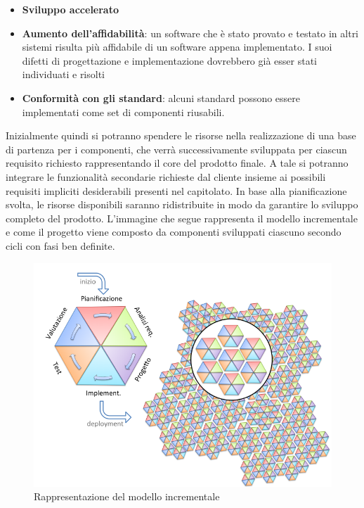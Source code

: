 \begin{itemize}
\begin{itemize}
			\item \textbf{Sviluppo accelerato}
			\item \textbf{Aumento dell'affidabilità}: un software che è stato provato e testato in altri sistemi risulta più affidabile di un software appena implementato. I suoi difetti di progettazione e implementazione dovrebbero già esser stati individuati e risolti
			\item \textbf{Conformità con gli standard}: alcuni standard
			possono essere implementati come set di componenti riusabili.
		\end{itemize}
	\end{itemize}
	Inizialmente quindi si potranno spendere le risorse nella realizzazione di una base di partenza per i componenti, che verrà successivamente sviluppata per ciascun requisito richiesto rappresentando il core del prodotto finale.
	A tale  si potranno integrare le funzionalità secondarie richieste dal cliente insieme ai possibili requisiti impliciti desiderabili presenti nel capitolato. In base alla pianificazione svolta, le risorse disponibili saranno ridistribuite in modo da garantire lo sviluppo completo del prodotto.
	L'immagine che segue rappresenta il modello incrementale e come il progetto viene composto da componenti sviluppati ciascuno secondo cicli con fasi ben definite.
	\begin{figure}[H]
		\centering
		\includegraphics[scale=0.5]{img/modello_incrementale.png}
		\caption{Rappresentazione del modello incrementale \protect\footnotemark}
	\end{figure}

	